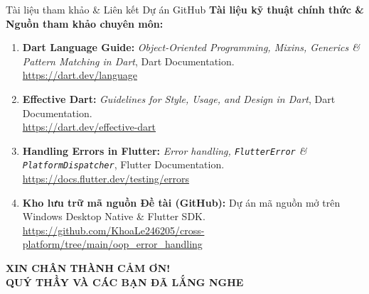 \documentclass[aspectratio=169, 10pt]{beamer}
\begin{document}
\begin{frame}{Tài liệu tham khảo \& Liên kết Dự án GitHub}
  \vspace{-0.15cm}
  \textbf{Tài liệu kỹ thuật chính thức \& Nguồn tham khảo chuyên môn:}
  \vspace{0.25cm}
  \begin{enumerate}
    \setlength{\itemsep}{6pt}
    \item \textbf{Dart Language Guide:} \textit{Object-Oriented Programming, Mixins, Generics \& Pattern Matching in Dart}, Dart Documentation.\\
    \url{https://dart.dev/language}

    \item \textbf{Effective Dart:} \textit{Guidelines for Style, Usage, and Design in Dart}, Dart Documentation.\\
    \url{https://dart.dev/effective-dart}

    \item \textbf{Handling Errors in Flutter:} \textit{Error handling, \texttt{FlutterError} \& \texttt{PlatformDispatcher}}, Flutter Documentation.\\
    \url{https://docs.flutter.dev/testing/errors}

    \item \textbf{Kho lưu trữ mã nguồn Đề tài (GitHub):} Dự án mã nguồn mở trên Windows Desktop Native \& Flutter SDK.\\
    {\small\url{https://github.com/KhoaLe246205/cross-platform/tree/main/oop_error_handling}}
  \end{enumerate}
\end{frame}


\begin{frame}[plain]
  \centering
  \vspace{1.8cm}
  {\LARGE \textbf{XIN CHÂN THÀNH CẢM ƠN!}}\\[0.3cm]
  {\large \textbf{QUÝ THẦY VÀ CÁC BẠN ĐÃ LẮNG NGHE}}\\[1.0cm]
 
\end{frame}
\end{document}
